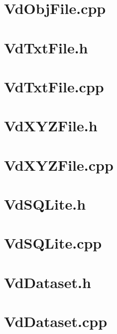 \documentclass[a4paper,12pt,bibliography=totoc, listof=totoc,titlepage,pointlessnumbers]{scrreprt}
\begin{document}
\begin{appendices}
\section{VdObjFile.cpp}
\label{a:VdObjFile.cpp}


\section{VdTxtFile.h}
\label{a:VdTxtFile.h}


\section{VdTxtFile.cpp}
\label{a:VdTxtFile.cpp}


\section{VdXYZFile.h}
\label{a:VdXYZFile.h}


\section{VdXYZFile.cpp}
\label{a:VdXYZFile.cpp}


\section{VdSQLite.h}
\label{a:VdSQLite.h}


\section{VdSQLite.cpp}
\label{a:VdSQLite.cpp}


\section{VdDataset.h}
\label{a:VdDataset.h}


\section{VdDataset.cpp}
\label{a:VdDataset.cpp}



\end{appendices}
\end{document}

